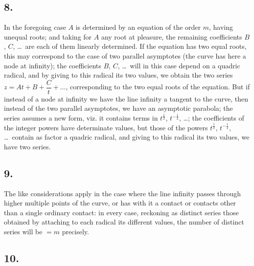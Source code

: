 \documentclass[11pt,a4paper]{book}
\begin{document}
\subsection*{8.}

In the foregoing case $A$ is determined by an equation of the order $m$, having unequal roots; and taking for $A$ any root at pleasure, the remaining coefficients $B$, $C$, \ldots\ are each of them linearly determined. If the equation has two equal roots, this may correspond to the case of two parallel asymptotes (the curve has here a node at infinity); the coefficients $B$, $C$, \ldots\ will in this case depend on a quadric radical, and by giving to this radical its two values, we obtain the two series $z = At + B + \dfrac{C}{t} + \ldots$, corresponding to the two equal roots of the equation. But if instead of a node at infinity we have the line infinity a tangent to the curve, then instead of the two parallel asymptotes, we have an asymptotic parabola; the series assumes a new form, viz. it contains terms in $t^{\frac{1}{2}}$, $t^{-\frac{1}{2}}$, \ldots; the coefficients of the integer powers have determinate values, but those of the powers $t^{\frac{1}{2}}$, $t^{-\frac{1}{2}}$, \ldots\ contain as factor a quadric radical, and giving to this radical its two values, we have two series.

\subsection*{9.}

The like considerations apply in the case where the line infinity passes through higher multiple points of the curve, or has with it a contact or contacts other than a single ordinary contact: in every case, reckoning as distinct series those obtained by attaching to each radical its different values, the number of distinct series will be $= m$ precisely.

\subsection*{10.}
\end{document}
